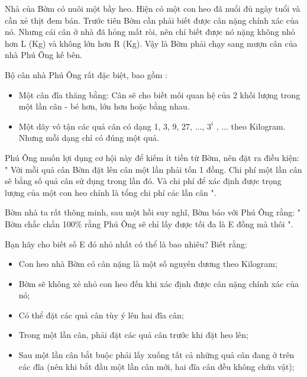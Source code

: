 Nhà của Bờm có nuôi một bầy heo. Hiện có một con heo đã nuổi đủ ngày tuổi và cần xẻ thịt đem bán. Trước tiên Bờm cần phải biết được cân nặng chính xác của nó. Nhưng cái cân ở nhà đã hỏng mất ròi, nên chỉ biết được nó nặng không nhỏ hơn L (Kg) và không lớn hơn R (Kg). Vậy là Bờm phải chạy sang mượn cân của nhà Phú Ông kế bên.  

   Bộ cân nhà Phú Ông rất đặc biệt, bao gồm :  
\begin{itemize}
	\item     Một cân đĩa thăng bằng: Cân sẽ cho biết mối quan hệ của 2 khối lượng trong một lần cân - bé hơn, lớn hơn hoặc bằng nhau.   
	\item     Một dãy vô tận các quả cân có dạng 1, 3, 9, 27, ..., $3^{i}$    , ... theo Kilogram. Nhưng mỗi dạng chỉ có đúng một quả.   
\end{itemize}

   Phú Ông muốn lợi dụng cơ hội này để kiếm ít tiền từ Bờm, nên đặt ra điều kiện: "   Với mỗi quả cân Bờm đặt lên cân một lần phải tốn 1 đồng. Chi phí một lần cân sẽ bằng số quả cân sử dụng trong lần đó. Và chi phí để xác định được trọng lượng của một con heo chính là tổng chi phí các lần cân   ".  

   Bờm nhà ta rất thông minh, sau một hồi suy nghĩ, Bờm bảo với Phú Ông rằng: "   Bờm chắc chắn 100\% rằng Phú Ông sẽ chỉ lấy được tối đa là E đồng mà thôi   ".  

   Bạn hãy cho biết số E đó nhỏ nhất có thể là bao nhiêu? Biết rằng:  
\begin{itemize}
	\item     Con heo nhà Bờm có cân nặng là một số nguyên dương theo Kilogram;   
	\item     Bờm sẽ không xẻ nhỏ con heo đến khi xác định được cân nặng chính xác của nó;   
	\item     Có thể đặt các quả cân tùy ý lên hai đĩa cân;   
	\item     Trong một lần cân, phải đặt các quả cân trước khi đặt heo lên;   
	\item     Sau một lần cân bắt buộc phải lấy xuống tất cả những quả cân đang ở trên  các đĩa (nên khi bắt đầu một lần cân mới, hai đĩa cân đều không chứa  vật);   
\end{itemize}